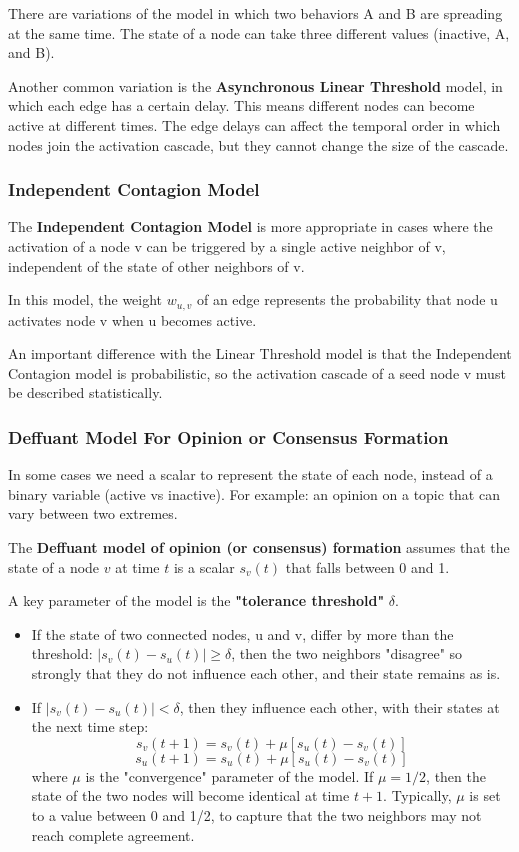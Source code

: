 \documentclass[11pt]{scrartcl} %
\begin{document}
There are variations of the model in which two behaviors A and B are spreading at the same time. The state of a node can take three different values (inactive, A, and B). 

Another common variation is the \textbf{Asynchronous Linear Threshold} model, in which each edge has a certain delay. This means different nodes can become active at different times. The edge delays can affect the temporal order in which nodes join the activation cascade, but they cannot change the size of the cascade.

\subsubsection{Independent Contagion Model}
The \textbf{Independent Contagion Model} is more appropriate in cases where the activation of a node v can be triggered by a single active neighbor of v, independent of the state of other neighbors of v. 

In this model, the weight $w_{u,v}$ of an edge represents the probability that node u activates node v when u becomes active.

An important difference with the Linear Threshold model is that the Independent Contagion model is probabilistic, so the activation cascade of a seed node v must be described statistically. 


\subsubsection{Deffuant Model For Opinion or Consensus Formation}
In some cases we need a scalar to represent the state of each node, instead of a binary variable (active vs inactive). For example: an opinion on a topic that can vary between two extremes.

The \textbf{Deffuant model of opinion (or consensus) formation} assumes that the state of a node $v$ at time $t$ is a scalar $s_v(t)$ that falls between 0 and 1.

A key parameter of the model is the \textbf{"tolerance threshold"} $\delta$.
\begin{itemize}
	\item If the state of two connected nodes, u and v, differ by more than the threshold: $|s_v(t)-s_u(t) | \geq \delta$, then the two neighbors "disagree" so strongly that they do not influence each other, and their state remains as is. %
	\item If $|s_v(t)-s_u(t) | < \delta$, then they influence each other, with their states at the next time step:
\[s_v(t+1) = s_v(t) + \mu [s_u(t) - s_v(t)]\]
\[s_u(t+1) = s_u(t) + \mu [s_u(t) - s_v(t)]\]
where $\mu$ is the "convergence" parameter of the model. If $\mu=1/2$, then the state of the two nodes will become identical at time $t+1$. Typically, $\mu$ is set to a value between 0 and 1/2, to capture that the two neighbors may not reach complete agreement.
\end{itemize}
\end{document}
